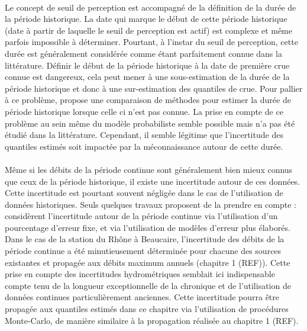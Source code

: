 \documentclass[11pt]{article}
\begin{document}
	\paragraph{} Le concept de seuil de perception est accompagné de la définition de la durée de la période historique. La date qui marque le début de cette période historique (date à partir de laquelle le seuil de perception est actif) est complexe et même parfois impossible à déterminer. Pourtant, à l'instar du seuil de perception, cette durée est généralement considérée comme étant parfaitement connue dans la littérature. Définir le début de la période historique à la date de première crue connue est dangereux, cela peut mener à une sous-estimation de la durée de la période historique et donc à une sur-estimation des quantiles de crue. Pour pallier à ce problème, \citet{prosdocimi_german_2018} propose une comparaison de méthodes pour estimer la durée de période historique lorsque celle ci n'est pas connue. La prise en compte de ce problème au sein même du modèle probabiliste semble possible mais n'a pas été étudié dans la littérature. Cependant, il semble légitime que l'incertitude des quantiles estimés soit impactée par la méconnaissance autour de cette durée. 
	
	\paragraph{} Même si les débits de la période continue sont généralement bien mieux connus que ceux de la période historique, il existe une incertitude autour de ces données. Cette incertitude est pourtant souvent négligée dans le cas de l'utilisation de données historiques. Seuls quelques travaux proposent de la prendre en compte : \citet{parkes_defining_2016} considèrent l'incertitude autour de la période continue via l'utilisation d'un pourcentage d'erreur fixe, et \citet{neppel_flood_2010} via l'utilisation de modèles d'erreur plus élaborés. Dans le cas de la station du Rhône à Beaucaire, l'incertitude des débits de la période continue a été minutieusement déterminée pour chacune des sources existantes et propagée aux débits maximum annuels (chapitre 1 (REF)). Cette prise en compte des incertitudes hydrométriques semblait ici indispensable compte tenu de la longueur exceptionnelle de la chronique et de l'utilisation de données continues particulièrement anciennes. Cette incertitude pourra être propagée aux quantiles estimés dans ce chapitre via l'utilisation de procédures Monte-Carlo, de manière similaire à la propagation réalisée au chapitre 1 (REF).
	
\end{document}
